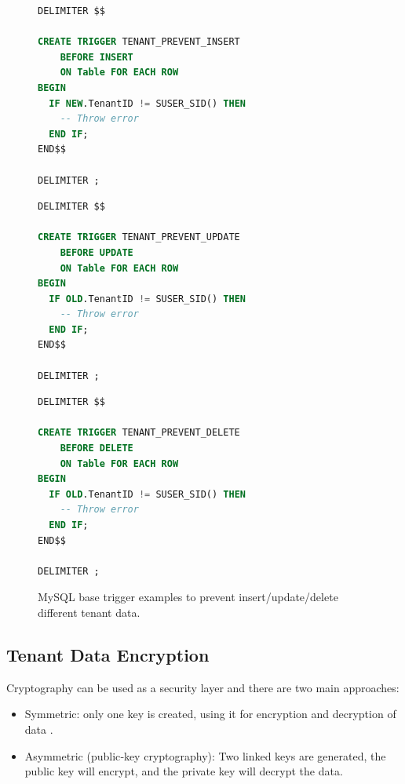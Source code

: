 \documentclass[12pt,english]{article} %
\begin{document}
\begin{figure}[h]
\centering
\begin{minipage}[t]{.31\textwidth}
\centering
\begin{lstlisting}[language=sql,numbers=none]
DELIMITER $$

CREATE TRIGGER TENANT_PREVENT_INSERT
    BEFORE INSERT
    ON Table FOR EACH ROW
BEGIN
  IF NEW.TenantID != SUSER_SID() THEN  
    -- Throw error
  END IF;
END$$    

DELIMITER ;
\end{lstlisting}
\end{minipage}%
\hspace{0.3cm}
\begin{minipage}[t]{.31\textwidth}
\centering
\begin{lstlisting}[language=sql,numbers=none]
DELIMITER $$

CREATE TRIGGER TENANT_PREVENT_UPDATE
    BEFORE UPDATE
    ON Table FOR EACH ROW
BEGIN
  IF OLD.TenantID != SUSER_SID() THEN  
    -- Throw error
  END IF;
END$$    

DELIMITER ;
\end{lstlisting}
\end{minipage}
\hspace{0.3cm}
\begin{minipage}[t]{.31\textwidth}
\centering
\begin{lstlisting}[language=sql,numbers=none]
DELIMITER $$

CREATE TRIGGER TENANT_PREVENT_DELETE
    BEFORE DELETE
    ON Table FOR EACH ROW
BEGIN
  IF OLD.TenantID != SUSER_SID() THEN  
    -- Throw error
  END IF;
END$$    

DELIMITER ;
\end{lstlisting}
\end{minipage}
\caption{MySQL base trigger examples to prevent insert/update/delete different tenant data.}
\label{fig:tenant-triggers-data-isolation}
\end{figure}


\subsection{Tenant Data Encryption}
Cryptography can be used as a security layer and there are two main approaches:
\begin{itemize}
    \item Symmetric: only one key is created, using it for encryption and decryption of data \cite{multi-tenant-data-architecture}.
    \item Asymmetric (public‐key cryptography): Two linked keys are generated, the public key will encrypt, and the private key will decrypt the data.
\end{itemize}
\end{document}
